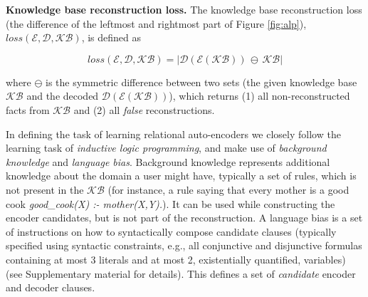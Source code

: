 \begin{definition}
\textbf{Knowledge base reconstruction loss.} 
The knowledge base reconstruction loss (the difference of the leftmost and rightmost part of Figure \ref{fig:alp}), $loss(\mathcal{E}, \mathcal{D}, \mathcal{KB})$, is defined as 

\begin{equation}
    loss(\mathcal{E},\mathcal{D},\mathcal{KB}) = | \mathcal{D}(\mathcal{E}(\mathcal{KB})) \, \ominus \, \mathcal{KB} |
    \label{eq:reconstruction}
\end{equation}


where $\ominus$ is the symmetric difference between two sets (the given knowledge base $\mathcal{KB}$ and the decoded $\mathcal{D}(\mathcal{E}(\mathcal{KB}))$), which returns (1) all non-reconstructed facts from $\mathcal{KB}$ and (2)  all \textit{false} reconstructions.
\end{definition}



In defining the task of learning relational auto-encoders we closely follow the learning task of \textit{inductive logic programming}, and make use of \textit{background knowledge} and \textit{language bias}.
Background knowledge represents additional knowledge about the domain a user might have, typically a set of rules, which is not present in the $\mathcal{KB}$ (for instance, a rule saying that every mother is a good cook \textit{good\_cook(X) :- mother(X,Y).}).
It can be used while constructing the encoder candidates, but is not part of the reconstruction. 
A language bias is a set of instructions on how to syntactically compose candidate clauses (typically specified using syntactic constraints, e.g., all conjunctive and disjunctive formulas containing at most 3 literals and at most 2, existentially quantified, variables) (see Supplementary material for details).
This defines a set of \textit{candidate} encoder and decoder clauses.



